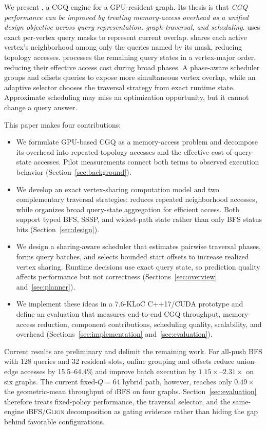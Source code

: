 We present \system, a CGQ engine for a GPU-resident graph.  Its thesis is that \emph{CGQ performance can be improved by treating memory-access overhead as a unified design objective across query representation, graph traversal, and scheduling}.  \system uses exact per-vertex query masks to represent current overlap.  \sharedexpand shares each active vertex's neighborhood among only the queries named by its mask, reducing topology accesses.  \coalescedgather processes the remaining query states in a vertex-major order, reducing their effective access cost during broad phases.  A phase-aware scheduler groups and offsets queries to expose more simultaneous vertex overlap, while an adaptive selector chooses the traversal strategy from exact runtime state.  Approximate scheduling may miss an optimization opportunity, but it cannot change a query answer.

This paper makes four contributions:

\begin{itemize}
  \item We formulate GPU-based CGQ as a memory-access problem and decompose its overhead into repeated topology accesses and the effective cost of query-state accesses.  Pilot measurements connect both terms to observed execution behavior (Section~\ref{sec:background}).
  \item We develop an exact vertex-sharing computation model and two complementary traversal strategies: \sharedexpand reduces repeated neighborhood accesses, while \coalescedgather organizes broad query-state aggregation for efficient access.  Both support typed BFS, SSSP, and widest-path state rather than only BFS status bits (Section~\ref{sec:design}).
  \item We design a sharing-aware scheduler that estimates pairwise traversal phases, forms query batches, and selects bounded start offsets to increase realized vertex sharing.  Runtime decisions use exact query state, so prediction quality affects performance but not correctness (Sections~\ref{sec:overview} and~\ref{sec:planner}).
  \item We implement these ideas in a 7.6-KLoC C++17/CUDA prototype and define an evaluation that measures end-to-end CGQ throughput, memory-access reduction, component contributions, scheduling quality, scalability, and overhead (Sections~\ref{sec:implementation} and~\ref{sec:evaluation}).
\end{itemize}

Current results are preliminary and delimit the remaining work.  For all-push BFS with 128 queries and 32 resident slots, online grouping and offsets reduce union-edge accesses by 15.5--64.4\% and improve batch execution by $1.15\times$--$2.31\times$ on six graphs.  The current fixed-$Q{=}64$ hybrid path, however, reaches only $0.49\times$ the geometric-mean throughput of \textsc{iBFS} on four graphs.  Section~\ref{sec:evaluation} therefore treats fixed-policy performance, the traversal selector, and the same-engine \textsc{iBFS}/\textsc{Glign} decomposition as gating evidence rather than hiding the gap behind favorable configurations.
